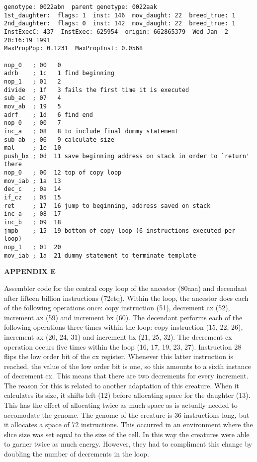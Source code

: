 \begin{verbatim}
genotype: 0022abn  parent genotype: 0022aak
1st_daughter:  flags: 1  inst: 146  mov_daught: 22  breed_true: 1
2nd_daughter:  flags: 0  inst: 142  mov_daught: 22  breed_true: 1
InstExecC: 437  InstExec: 625954  origin: 662865379  Wed Jan  2 20:16:19 1991
MaxPropPop: 0.1231  MaxPropInst: 0.0568

nop_0   ; 00   0
adrb    ; 1c   1 find beginning
nop_1   ; 01   2
divide  ; 1f   3 fails the first time it is executed
sub_ac  ; 07   4
mov_ab  ; 19   5
adrf    ; 1d   6 find end
nop_0   ; 00   7
inc_a   ; 08   8 to include final dummy statement
sub_ab  ; 06   9 calculate size
mal     ; 1e  10
push_bx ; 0d  11 save beginning address on stack in order to `return' there
nop_0   ; 00  12 top of copy loop
mov_iab ; 1a  13
dec_c   ; 0a  14
if_cz   ; 05  15
ret     ; 17  16 jump to beginning, address saved on stack
inc_a   ; 08  17
inc_b   ; 09  18
jmpb    ; 15  19 bottom of copy loop (6 instructions executed per loop)
nop_1   ; 01  20
mov_iab ; 1a  21 dummy statement to terminate template
\end{verbatim}

\newpage
\LP
\bf APPENDIX E\rm
\eLP

Assembler code for the central copy loop of the ancestor
(80aaa) and decendant after fifteen billion instructions (72etq).  Within
the loop, the ancestor does each of the following operations once: copy
instruction (51), decrement cx (52), increment ax (59) and increment bx (60).
The decendant performs each of the following operations three times within
the loop: copy instruction (15, 22, 26), increment ax (20, 24, 31) and
increment bx (21, 25, 32).  The decrement cx operation occurs five times
within the loop (16, 17, 19, 23, 27).  Instruction 28 flips the low order
bit of the cx register.  Whenever this latter instruction is reached, the
value of the low order bit is one, so this amounts to a sixth instance of
decrement cx.  This means that there are two decrements for every increment.
The reason for this is related to another adaptation of this creature.  When
it calculates its size, it shifts left (12) before allocating space for the
daughter (13).  This has the effect of allocating twice as much space as
is actually needed to accomodate the genome.  The genome of the creature
is 36 instructions long, but it allocates a space of 72 instructions.
This occurred in an environment where the slice size was set equal to the
size of the cell.  In this way the creatures were able to garner twice as
much energy.  However, they had to compliment this change by doubling the
number of decrements in the loop.

